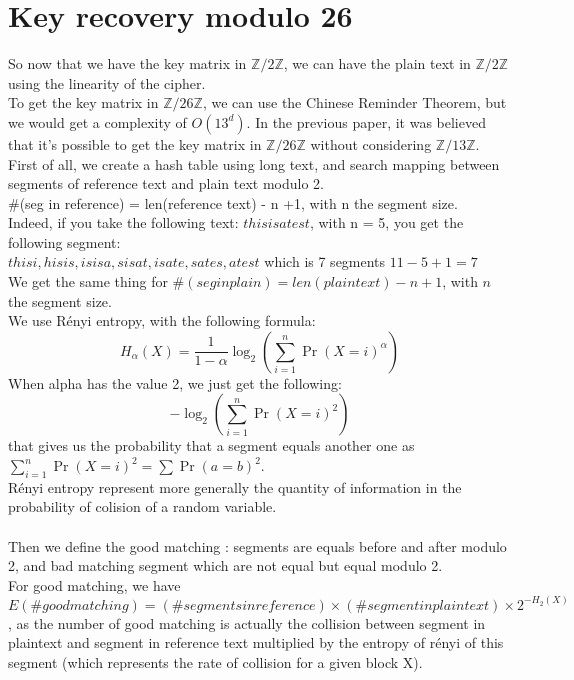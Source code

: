 \documentclass{article}
\begin{document}
\section{Key recovery modulo 26}
So now that we have the key matrix in $\mathbb{Z}/2\mathbb{Z}$, we can have the plain text in $\mathbb{Z}/2\mathbb{Z}$ using the linearity of the cipher.\\
To get the key matrix in $\mathbb{Z}/26\mathbb{Z}$, we can use the Chinese Reminder Theorem, but we would get a complexity of $O(13^d)$. In the previous paper, it was believed that it's possible to get the key matrix in $\mathbb{Z}/26\mathbb{Z}$ without considering $\mathbb{Z}/13\mathbb{Z}$.\\
First of all, we create a hash table using long text, and search mapping between segments of reference text and plain text modulo 2.\\
\#(seg in reference) = len(reference text) - n +1, with n the segment size.\\
Indeed, if you take the following text: $thisisatest$, with n = 5, you get the following segment:\\
 $ thisi, hisis, isisa, sisat, isate, sates, atest $ which is 7 segments $ 11 - 5 + 1 = 7 $\\
We get the same thing for $\#(seg in plain) = len(plain text) - n +1$, with $n$ the segment size.\\
We use R\'enyi entropy, with the following formula:\\
$$H_{\alpha}(X) = \frac{1}{1-\alpha}\log_{2}(\sum_{i=1}^{n}{\Pr(X=i)^{\alpha}})$$ 
When alpha has the value 2, we just get the following:
$$-\log_{2}(\sum_{i=1}^{n}{\Pr(X=i)^{2}})$$ that gives us the probability that a segment equals another one as $\sum_{i=1}^{n}{\Pr(X=i)^{2}} = \sum{\Pr(a=b)^{2}}$.\\
R\'enyi entropy represent more generally the quantity of information in the probability of colision of a random variable.\\
\\
Then we define the good matching : segments are equals before and after modulo 2, and bad matching segment which are not equal but equal modulo 2.\\
${}$\hspace{1em}For good matching, we have $E(\# good matching) = (\# segments in reference) \times (\#segment in plaintext) \times 2^{-H_{2}(X)}$, as the number of good matching is actually the collision between segment in plaintext and segment in reference text multiplied by the entropy of r\'enyi of this segment (which represents the rate of collision for a given block X).\\
\end{document}
